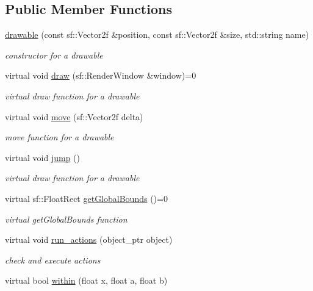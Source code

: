 \subsection*{Public Member Functions}
\begin{DoxyCompactItemize}
\item 
\hyperlink{classdrawable_a4e7881285581530d21b5c9fd59879b30}{drawable} (const sf\+::\+Vector2f \&position, const sf\+::\+Vector2f \&size, std\+::string name)
\begin{DoxyCompactList}\small\item\em constructor for a drawable \end{DoxyCompactList}\item 
virtual void \hyperlink{classdrawable_a4e49e2c1121704c83ce24c5f48dd910f}{draw} (sf\+::\+Render\+Window \&window)=0
\begin{DoxyCompactList}\small\item\em virtual draw function for a drawable \end{DoxyCompactList}\item 
virtual void \hyperlink{classdrawable_ad0d3930c045cc6776aa2c3965be32491}{move} (sf\+::\+Vector2f delta)
\begin{DoxyCompactList}\small\item\em move function for a drawable \end{DoxyCompactList}\item 
virtual void \hyperlink{classdrawable_ac39691470b7874f5dec59efe649d3981}{jump} ()
\begin{DoxyCompactList}\small\item\em virtual draw function for a drawable \end{DoxyCompactList}\item 
virtual sf\+::\+Float\+Rect \hyperlink{classdrawable_ae013ac0be47538be9ce885d6642daf73}{get\+Global\+Bounds} ()=0
\begin{DoxyCompactList}\small\item\em virtual get\+Global\+Bounds function \end{DoxyCompactList}\item 
virtual void \hyperlink{classdrawable_a715df01a318331e5611a2b0ad30109ff}{run\+\_\+actions} (object\+\_\+ptr object)
\begin{DoxyCompactList}\small\item\em check and execute actions \end{DoxyCompactList}\item 
virtual bool \hyperlink{classdrawable_a0d3278e4e888fc8289468e8893dd8329}{within} (float x, float a, float b)

\end{DoxyCompactItemize}
